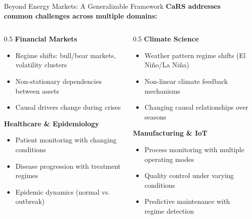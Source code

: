 \documentclass[aspectratio=169]{beamer}
\begin{document}
\begin{frame}{Beyond Energy Markets: A Generalizable Framework}
\textbf{CaRS addresses common challenges across multiple domains:}

\vspace{0.3cm}
\begin{columns}
\begin{column}{0.5\textwidth}
\textbf{Financial Markets}
\begin{itemize}
    \item Regime shifts: bull/bear markets, volatility clusters
    \item Non-stationary dependencies between assets
    \item Causal drivers change during crises
\end{itemize}

\vspace{0.2cm}
\textbf{Healthcare \& Epidemiology}
\begin{itemize}
    \item Patient monitoring with changing conditions
    \item Disease progression with treatment regimes
    \item Epidemic dynamics (normal vs. outbreak)
\end{itemize}
\end{column}

\begin{column}{0.5\textwidth}
\textbf{Climate Science}
\begin{itemize}
    \item Weather pattern regime shifts (El Ni\~{n}o/La Ni\~{n}a)
    \item Non-linear climate feedback mechanisms
    \item Changing causal relationships over seasons
\end{itemize}

\vspace{0.2cm}
\textbf{Manufacturing \& IoT}
\begin{itemize}
    \item Process monitoring with multiple operating modes
    \item Quality control under varying conditions
    \item Predictive maintenance with regime detection
\end{itemize}
\end{column}
\end{columns}

\vspace{0.3cm}
\begin{center}
\end{center}
\end{frame}
\end{document}
